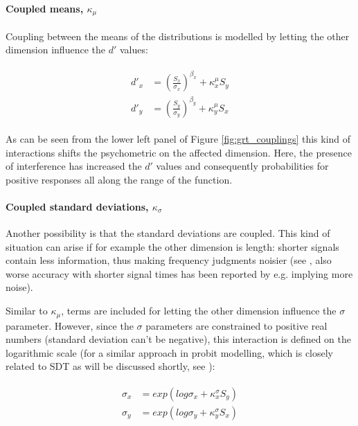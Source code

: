 \documentclass{article}\usepackage{knitr}
\begin{document}
\paragraph{Coupled means, $\kappa_{\mu}$}

Coupling between the means of the distributions is modelled by letting the other dimension influence the $d'$ values: 

\begin{align}
\label{eq:kappa_mu}
\begin{split}
d'_x &= (\frac{S_x}{\sigma_x})^{\beta_x} + \kappa_x^{\mu} S_y \\
d'_y &= (\frac{S_y}{\sigma_y})^{\beta_y} + \kappa_y^{\mu} S_x
\end{split}
\end{align}

As can be seen from the lower left panel of Figure \ref{fig:grt_couplings} this kind of interactions shifts the psychometric on the affected dimension. Here, the presence of interference has increased the $d'$ values and consequently probabilities for positive responses all along the range of the function.

\paragraph{Coupled standard deviations, $\kappa_{\sigma}$}

Another possibility is that the standard deviations are coupled. This kind of situation can arise if for example the other dimension is length: shorter signals contain less information, thus making frequency judgments noisier (see \citet[p.274]{houtsma1995}, also worse accuracy with shorter signal times has been reported by e.g. \cite{townsend1988} implying more noise).

Similar to $\kappa_{\mu}$, terms are included for letting the other dimension influence the $\sigma$ parameter. However, since the $\sigma$ parameters are constrained to positive real numbers (standard deviation can't be negative), this interaction is defined on the logarithmic scale (for a similar approach in probit modelling, which is closely related to SDT as will be discussed shortly, see \citet{freeman2018}):

\begin{align}
\label{eq:varshift}
\begin{split}
\sigma_x &= exp(log\sigma_x + \kappa_x^{\sigma} S_y) \\
\sigma_y &= exp(log\sigma_y + \kappa_y^{\sigma} S_x)
\end{split}
\end{align}
\end{document}
